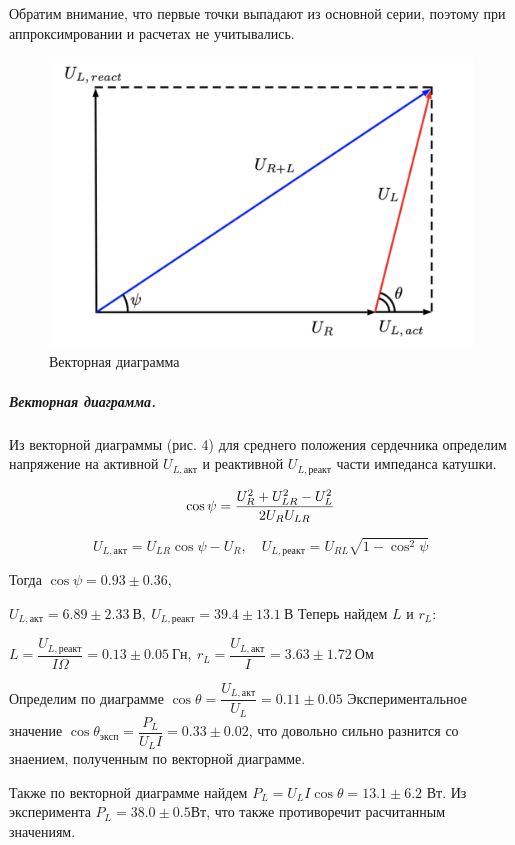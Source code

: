 \documentclass[12pt,a4paper]{article}
\begin{document}
Обратим внимание, что первые точки выпадают из основной серии, поэтому при аппроксимровании и расчетах не учитывались.

\begin{figure}
    \centering
    \includegraphics[width=\linewidth]{pics/vec.png}
    \caption{Векторная диаграмма}
\end{figure}

\subparagraph*{Векторная диаграмма.} 
Из векторной диаграммы (рис. 4) для среднего положения сердечника определим напряжение на активной $U_{L, акт}$ и реактивной $U_{L, реакт}$ части импеданса катушки.

\[\cos \psi = {U_R^2 + U_{LR}^2 - U_L^2 \over 2 U_RU_{LR}}\]

\[U_{L, акт} = U_{LR} \cos \psi - U_R,\quad U_{L, реакт} = U_{RL}\sqrt{1 - \cos^2 \psi}\]

Тогда $\cos \psi = 0.93 \pm 0.36$,

$ U_{L, акт} = 6.89 \pm 2.33\ В,\ U_{L, реакт} = 39.4 \pm 13.1\ В$
Теперь найдем $L$ и $r_L$:

$L = \dfrac{U_{L, реакт}}{I\Omega} = 0.13 \pm 0.05\ Гн,\ r_L = \dfrac{U_{L,акт}}{I} = 3.63 \pm 1.72\ Ом$

Определим по диаграмме $\cos \theta = \dfrac{U_{L, акт}}{U_L} = 0.11 \pm 0.05$
Экспериментальное значение $\cos \theta_{эксп} = \dfrac{P_L}{U_L I} = 0.33 \pm 0.02$, что довольно сильно разнится со знаением, полученным по векторной диаграмме.

Также по векторной диаграмме найдем $P_L = U_L I \cos \theta = 13.1 \pm 6.2$ Вт.
Из эксперимента $P_L = 38.0 \pm 0.5 Вт$, что также противоречит расчитанным значениям.
\end{document}
